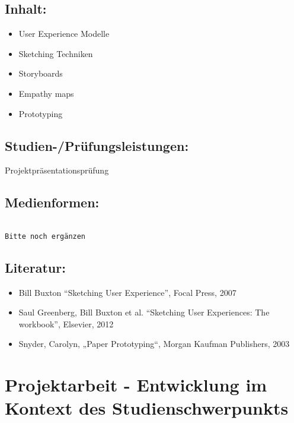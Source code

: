 \section*{Inhalt:}\label{inhalt-7}

\begin{itemize}
\tightlist
\item
  User Experience Modelle
\item
  Sketching Techniken
\item
  Storyboards
\item
  Empathy maps
\item
  Prototyping
\end{itemize}

\section*{Studien-/Prüfungsleistungen:}\label{studien-pruxfcfungsleistungen-7}

Projektpräsentationsprüfung

\section*{Medienformen:}\label{medienformen-7}

\begin{verbatim}

Bitte noch ergänzen
\end{verbatim}

\section*{Literatur:}\label{literatur-7}

\begin{itemize}
\tightlist
\item
  Bill Buxton ``Sketching User Experience'', Focal Press, 2007
\item
  Saul Greenberg, Bill Buxton et al. ``Sketching User Experiences: The
  workbook'', Elsevier, 2012
\item
  Snyder, Carolyn, „Paper Prototyping``, Morgan Kaufman Publishers, 2003
\end{itemize}

\chapter{Projektarbeit - Entwicklung im Kontext des
Studienschwerpunkts}\label{projektarbeit---entwicklung-im-kontext-des-studienschwerpunkts}


